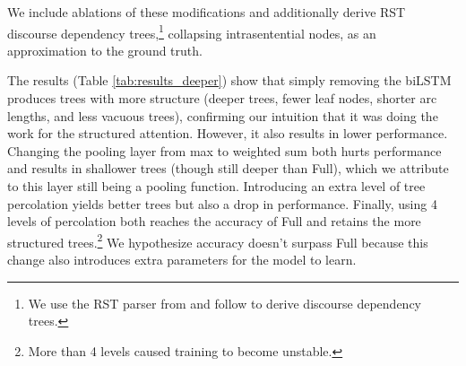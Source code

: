 We include ablations of these modifications and additionally derive RST discourse dependency trees,\footnote{We use the RST parser from \citet{Feng:2014} and follow \citet{Hirao:2013} to derive discourse dependency trees.} collapsing intrasentential nodes, as an approximation to the ground truth.

The results (Table \ref{tab:results_deeper}) show that simply removing the biLSTM produces trees with more structure (deeper trees, fewer leaf nodes, shorter arc lengths, and less vacuous trees), confirming our intuition that it was doing the work for the structured attention. However, it also results in lower performance. Changing the pooling layer from max to  weighted sum both hurts performance and results in shallower trees (though still deeper than Full), which we attribute to this layer still being a pooling function. Introducing an extra level of tree percolation yields better trees but also a drop in performance. Finally, using 4 levels of percolation both reaches the accuracy of Full and retains the more structured trees.\footnote{More than 4 levels caused training to become unstable.} We hypothesize accuracy doesn't surpass Full because this change also introduces extra parameters for the model to learn.


